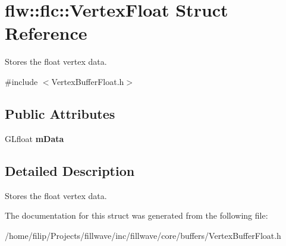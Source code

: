 \hypertarget{structflw_1_1flc_1_1VertexFloat}{}\section{flw\+:\+:flc\+:\+:Vertex\+Float Struct Reference}
\label{structflw_1_1flc_1_1VertexFloat}


Stores the float vertex data.  




{\ttfamily \#include $<$Vertex\+Buffer\+Float.\+h$>$}

\subsection*{Public Attributes}
\begin{DoxyCompactItemize}
\item 
G\+Lfloat {\bfseries m\+Data}\hypertarget{structflw_1_1flc_1_1VertexFloat_a253155de7cc292ccd297f941c2d8c68b}{}\label{structflw_1_1flc_1_1VertexFloat_a253155de7cc292ccd297f941c2d8c68b}

\end{DoxyCompactItemize}


\subsection{Detailed Description}
Stores the float vertex data. 

The documentation for this struct was generated from the following file\+:\begin{DoxyCompactItemize}
\item 
/home/filip/\+Projects/fillwave/inc/fillwave/core/buffers/Vertex\+Buffer\+Float.\+h\end{DoxyCompactItemize}
